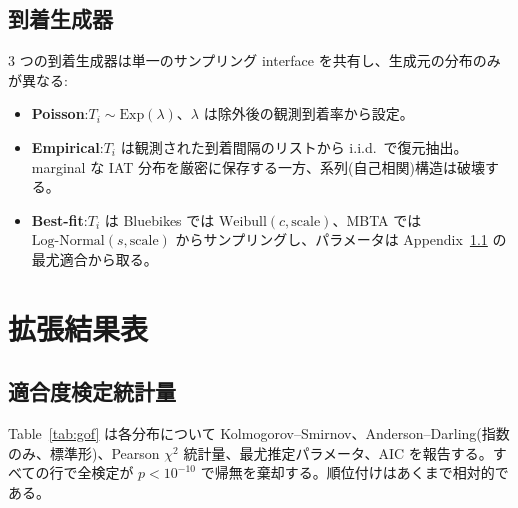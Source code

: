 \subsection{到着生成器}\label{app:arrival-generators}

3 つの到着生成器は単一のサンプリング interface を共有し、生成元の分布のみが異なる:
\begin{itemize}\itemsep 0pt
\item \textbf{Poisson}:$T_i \sim \mathrm{Exp}(\lambda)$、$\lambda$ は除外後の観測到着率から設定。
\item \textbf{Empirical}:$T_i$ は観測された到着間隔のリストから i.i.d.\ で復元抽出。marginal な IAT 分布を厳密に保存する一方、系列(自己相関)構造は破壊する。
\item \textbf{Best-fit}:$T_i$ は Bluebikes では $\text{Weibull}(c, \text{scale})$、MBTA では $\text{Log-Normal}(s, \text{scale})$ からサンプリングし、パラメータは Appendix~\ref{app:gof} の最尤適合から取る。
\end{itemize}

\section{拡張結果表}\label{app:tables}

\subsection{適合度検定統計量}\label{app:gof}

Table~\ref{tab:gof} は各分布について Kolmogorov--Smirnov、Anderson--Darling(指数のみ、標準形)、Pearson $\chi^2$ 統計量、最尤推定パラメータ、AIC を報告する。すべての行で全検定が $p < 10^{-10}$ で帰無を棄却する。順位付けはあくまで相対的である。

